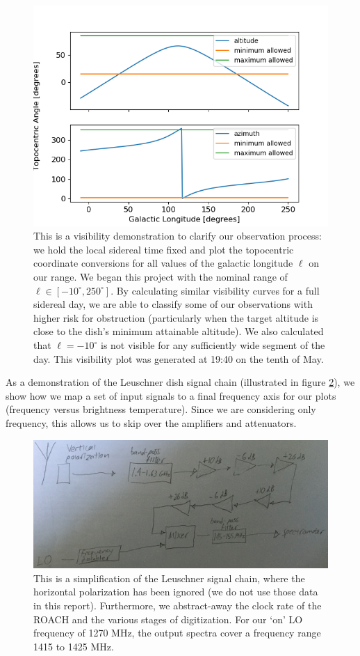 \documentclass[12pt]{article}
\begin{document}
\begin{figure}
	\centering
	\includegraphics[width=.75\linewidth]{1940_10_05_2020}
	\caption{This is a visibility demonstration to clarify our observation process: we hold the local sidereal time fixed and plot the topocentric coordinate conversions for all values of the galactic longitude $\ell$ on our range. We began this project with the nominal range of $\ell \in [-10^\circ, 250^\circ]$. By calculating similar visibility curves for a full sidereal day, we are able to classify some of our observations with higher risk for obstruction (particularly when the target altitude is close to the dish's minimum attainable altitude). We also calculated that $\ell=-10^\circ$ is not visible for any sufficiently wide segment of the day. This visibility plot was generated at 19:40 on the tenth of May.}
	\label{fig:vis_demo}
\end{figure}

As a demonstration of the Leuschner dish signal chain (illustrated in figure \ref{fig:sig_chain}), we show how we map a set of input signals to a final frequency axis for our plots (frequency versus brightness temperature). Since we are considering only frequency, this allows us to skip over the amplifiers and attenuators.

\begin{figure}
	\centering
	\includegraphics[width=.9\linewidth]{sig_chain}
	\caption{This is a simplification of the Leuschner signal chain, where the horizontal polarization has been ignored (we do not use those data in this report). Furthermore, we abstract-away the clock rate of the ROACH and the various stages of digitization. For our `on' LO frequency of 1270 MHz, the output spectra cover a frequency range 1415 to 1425 MHz.}
	\label{fig:sig_chain}
\end{figure}
\end{document}
